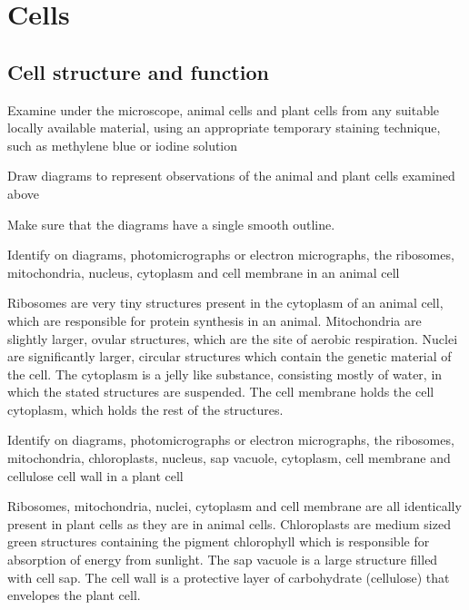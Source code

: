\section{Cells}
\subsection{Cell structure and function}

\begin{point}
Examine under the microscope, animal cells and plant cells from any suitable locally available material,
using an appropriate temporary staining technique, such as methylene blue or iodine solution
\end{point}

\begin{point}
Draw diagrams to represent observations of the animal and plant cells examined above
\end{point}

Make sure that the diagrams have a single smooth outline.

\begin{point}
Identify on diagrams, photomicrographs or electron micrographs, the ribosomes, mitochondria, nucleus,
cytoplasm and cell membrane in an animal cell
\end{point}

Ribosomes are very tiny structures present in the cytoplasm of an animal cell, which are
responsible for protein synthesis in an animal. Mitochondria are slightly larger, ovular 
structures, which are the site of aerobic respiration. Nuclei are significantly larger, circular
structures which contain the genetic material of the cell. The cytoplasm is a jelly like
substance, consisting mostly of water, in which the stated structures are suspended. The
cell membrane holds the cell cytoplasm, which holds the rest of the structures.

\begin{point}
Identify on diagrams, photomicrographs or electron micrographs, the ribosomes, mitochondria,
chloroplasts, nucleus, sap vacuole, cytoplasm, cell membrane and cellulose cell wall in a plant cell
\end{point}

Ribosomes, mitochondria, nuclei, cytoplasm and cell membrane are all identically present in plant
cells as they are in animal cells. Chloroplasts are medium sized green structures containing
the pigment chlorophyll which is responsible for absorption of energy from sunlight. The sap
vacuole is a large structure filled with cell sap. The cell wall is a protective layer of
carbohydrate (cellulose) that envelopes the plant cell.

